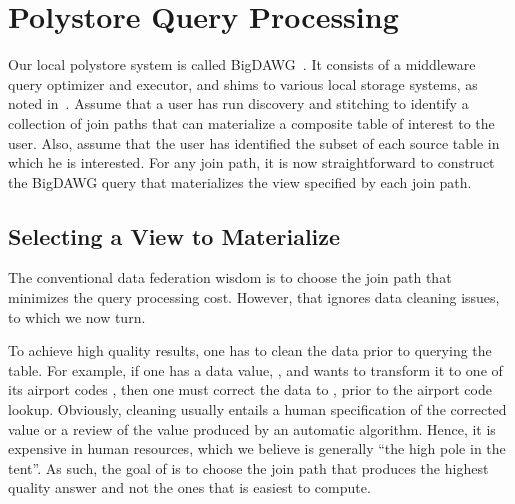 \section{Polystore Query Processing}
\label{sec:curating}

Our local polystore system is called BigDAWG~\cite{DBLP:journals/pvldb/ElmoreDSBCGHHKK15}. It consists of a middleware query optimizer and executor, and shims to various local storage systems, as noted in~\cite{DBLP:journals/sigmod/DugganESBHKMMMZ15,DBLP:journals/pvldb/ElmoreDSBCGHHKK15}. Assume that a user has run discovery and stitching to identify a collection of join paths that can materialize a composite table of interest to the user.  Also, assume that the user has identified the subset of each source table in which he is interested. For any join path, it is now straightforward to construct the BigDAWG query that materializes the view specified by each join path. 

\subsection{Selecting a View to Materialize}


The conventional data federation wisdom is to choose the join path that minimizes the query processing cost. However, that ignores data cleaning issues, to which we now turn.

To achieve high quality results, one has to clean the data prior to querying the table. For example, if one has a data value, , and wants to transform it to one of its airport codes , then one must correct the data to , prior to the airport code lookup. Obviously, cleaning usually entails a human specification of the corrected value or a review of the value produced by an automatic algorithm. Hence, it is expensive in human resources, which we believe is generally ``the high pole in the tent''. 
As such, the goal of \dcv is to choose the join path that produces the highest quality answer and not the ones that is easiest to compute. 

